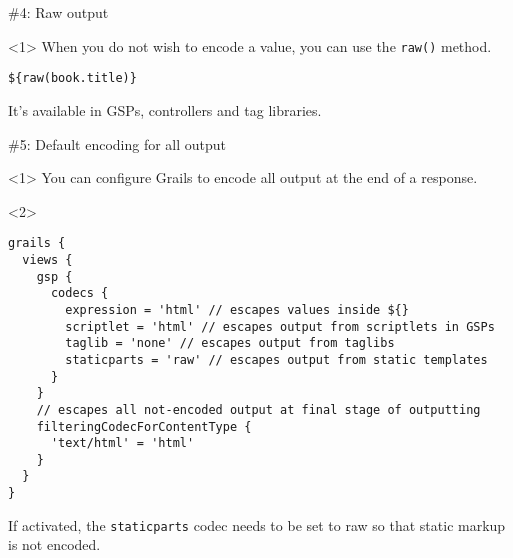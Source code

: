 \begin{frame}

    \begin{center}
      \Huge\color{green} \#4: Raw output
    \end{center}

    \vspace{1cm}

    \begin{onlyenv}<1>
      When you do not wish to encode a value, you can use the \verb|raw()| method.
      \begin{center}
        \begin{minipage}{\textwidth}
          \begin{verbatim}
${raw(book.title)}
          \end{verbatim}
        \end{minipage}
      \end{center}

      It's available in GSPs, controllers and tag libraries.
    \end{onlyenv}

\end{frame}



\begin{frame}

    \begin{center}
      \Huge\color{green} \#5: Default encoding for all output
    \end{center}

    \vspace{1cm}

    \begin{onlyenv}<1>
      You can configure Grails to encode all output at the end of a response.
    \end{onlyenv}

    \begin{onlyenv}<2>
      \begin{center}
        \begin{minipage}{1.1\textwidth}
          \begin{verbatim}
grails {
  views {
    gsp {
      codecs {
        expression = 'html' // escapes values inside ${}
        scriptlet = 'html' // escapes output from scriptlets in GSPs
        taglib = 'none' // escapes output from taglibs
        staticparts = 'raw' // escapes output from static templates
      }
    }
    // escapes all not-encoded output at final stage of outputting
    filteringCodecForContentType {
      'text/html' = 'html'
    }
  }
}
          \end{verbatim}
        \end{minipage}
      \end{center}

      If activated, the \verb|staticparts| codec needs to be set to raw so
      that static markup is not encoded.
    \end{onlyenv}

\end{frame}
